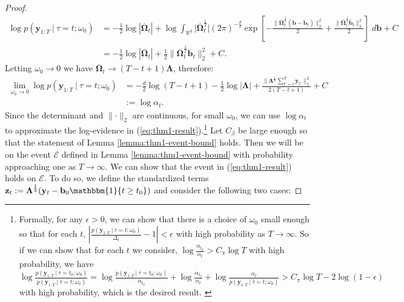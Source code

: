 \begin{proof}
\begin{align*}
    \log p(\mathbf{y}_{1:T} \:|\:\tau = t ; \omega_0)
    &=  -\frac{1}{2}\log |\overline{\boldsymbol{\Omega}}_t| + \log \int_{\mathbb{R}^d} \big|\overline{\boldsymbol{\Omega}}^{\frac{1}{2}}_t\big|(2\pi)^{-\frac{d}{2}}\exp\left[-\frac{\lVert\overline{\boldsymbol{\Omega}}^{\frac{1}{2}}_t(\mathbf{b} - \overline{\mathbf{b}}_t)\rVert_2^2}{2} + \frac{\lVert \overline{\boldsymbol{\Omega}}^{\frac{1}{2}}_t \overline{\mathbf{b}}_t\rVert_2^2}{2}\right] \; d\mathbf{b} + C\\
    &= -\frac{1}{2}\log |\overline{\boldsymbol{\Omega}}_t| + \frac{1}{2}\lVert \overline{\boldsymbol{\Omega}}^{\frac{1}{2}}_t \overline{\mathbf{b}}_t\rVert_2^2 + C.
\end{align*}
Letting $\omega_0 \to 0$ we have $\overline{\boldsymbol{\Omega}}_t \to (T-t + 1)\boldsymbol{\Lambda}$, therefore: 
\begin{align*}
    \lim_{\omega_0\to 0} \log p(\mathbf{y}_{1:T} \:|\: \tau = t; \omega_0) &= -\frac{d}{2}\log(T - t + 1) - \frac{1}{2}\log |\boldsymbol{\Lambda}| + \frac{\lVert \boldsymbol{\Lambda}^{\frac{1}{2}}\sum_{t'=t}^T\mathbf{y}_{t'}\rVert_2^2}{2(T-t+1)}+ C \\
    &:= \log \alpha_t.
\end{align*}
Since the determinant and $\lVert \cdot \rVert_2$ are continuous, for small $\omega_0$, we can use $\log \alpha_t$ to approximate the log-evidence in (\ref{eq:thm1-result}).\footnote{Formally, for any $\epsilon > 0$, we can show that there is a choice of $\omega_0$ small enough so that for each $t$, $|\frac{p(\mathbf{y}_{1:T} \:|\:\tau = t ; \omega_0)}{\Delta_{t}}-1| < \epsilon$ with high probability as $T \to \infty$. So if we can show that for each $t$ we consider, $\log \frac{\alpha_{t_0}}{\alpha_t} > C_\pi \log T$ with high probability, we have $\log \frac{p(\mathbf{y}_{1:T} \:|\:\tau = t_0 ; \omega_0)}{p(\mathbf{y}_{1:T} \:|\:\tau = t ; \omega_0)} = \log\frac{p(\mathbf{y}_{1:T} \:|\:\tau = t_0 ; \omega_0)}{\alpha_{t_0}} + \log \frac{\alpha_{t_0}}{\alpha_t} + \log \frac{\alpha_t}{p(\mathbf{y}_{1:T} \:|\:\tau = t ; \omega_0)} > C_\pi\log T -2 \log(1-\epsilon)$ with high probability, which is the desired result. \label{fn:approx}} Let $C_\beta$ be large enough so that the statement of Lemma \ref{lemma:thm1-event-bound} holds. Then we will be on the event $\mathcal{E}$ defined in Lemma \ref{lemma:thm1-event-bound} with probability approaching one as $T\to\infty$. We can show that the event in (\ref{eq:thm1-result}) holds on $\mathcal{E}$. To do so, we define the standardized terms $\mathbf{z}_t := \boldsymbol{\Lambda}^{\frac{1}{2}}(\mathbf{y}_t - \mathbf{b}_0\mathbbm{1}\{t\geq t_0\})$ and consider the following two cases:


\end{proof}
